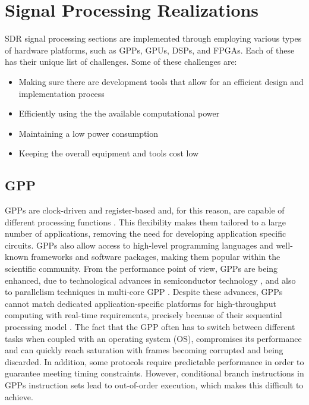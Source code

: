 \section{Signal Processing Realizations}
\label{sect:dsp_realizations}

SDR signal processing sections are implemented through employing various types of hardware platforms, such as GPPs, GPUs, DSPs, and FPGAs. Each of these has their unique list of challenges. Some of these challenges are:
\begin{itemize}
  \item Making sure there are development tools that allow for an efficient design and implementation process
  \item Efficiently using the the available computational power
  \item Maintaining a low power consumption
  \item Keeping the overall equipment and tools cost low
\end{itemize}

\subsection{GPP}
GPPs are clock-driven and register-based and, for this reason, are capable of different processing functions \cite{microprocessors_and_microcontrollers}. This flexibility makes them tailored to a large number of applications, removing the need for developing application specific circuits. GPPs also allow access to high-level programming languages and well-known frameworks and software packages, making them popular within the scientific community. From the performance point of view, GPPs are being enhanced, due to technological advances in semiconductor technology \cite{lin2014a}, and also to parallelism techniques  in multi-core GPP \cite{ulversoy2010a}. Despite these advances, GPPs cannot match dedicated application-specific platforms for high-throughput computing with real-time requirements, precisely because of their sequential processing model \cite{kamal2003a}. The fact that the GPP often has to switch between different tasks when coupled with an operating system (OS), compromises its performance and can quickly reach saturation with frames becoming corrupted and being discarded. In addition, some protocols require predictable performance in order to guarantee meeting timing constraints. However, conditional branch instructions in GPPs instruction sets lead to out-of-order execution, which makes this difficult to achieve.

